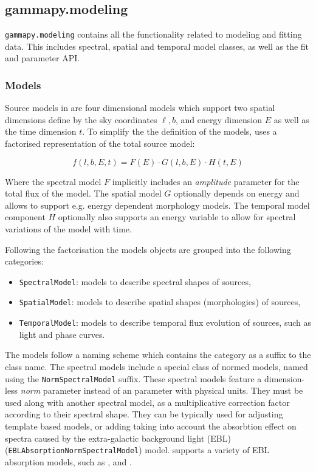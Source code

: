 \documentclass[traditabstract, longauth]{aa}
\newcommand{\code}[1]{\texttt{#1}}
\begin{document}
\subsection{gammapy.modeling}
\label{ssec:gammapy-modeling}
%
\code{gammapy.modeling} contains all the functionality related to modeling and fitting
data. This includes spectral, spatial and temporal model classes, as well as
the fit and parameter API.

\subsubsection{Models}
\label{sssec:models}
Source models in \gammapy are four dimensional models which support two
spatial dimensions define by the sky coordinates $\ell, b$, and energy dimension $E$ as well as
the time dimension $t$. To simplify the the definition of the
models, \gammapy uses a factorised representation of the total source
model:

\begin{equation}
    f(l, b, E, t) = F(E)  \cdot G(l, b, E) \cdot  H(t, E)
\end{equation}

Where the spectral model $F$ implicitly includes an \textit{amplitude} parameter
for the total flux of the model. The spatial model $G$ optionally depends
on energy and allows to support e.g. energy dependent
morphology models. The temporal model component $H$
optionally also supports an energy variable to
allow for spectral variations of the model with time.

Following the factorisation the models objects are grouped
into the following categories:

\begin{itemize}
	\item \code{SpectralModel}: models to describe spectral shapes of sources,
	\item \code{SpatialModel}: models to describe spatial shapes (morphologies) of sources,
	\item \code{TemporalModel}: models to describe temporal flux evolution of sources, such as
	      light and phase curves.
\end{itemize}

The models follow a naming scheme which contains the category as a suffix to
the class name. The spectral models include a special class of normed models,
named using the \code{NormSpectralModel} suffix.
These spectral models feature a dimension-less \textit{norm} parameter
instead of an  parameter with physical units. They
must be used along with another spectral model, as a multiplicative correction
factor according to their spectral shape. They can be typically used for
adjusting template based models, or adding taking into account
the absorbtion effect on 
\gammaray spectra caused by the extra-galactic background light (EBL) (\code{EBLAbsorptionNormSpectralModel})
model. \gammapy supports a variety of EBL absorption models, such as
\cite{Franceschini2008}, \cite{Finke2010} and \cite{Dominguez2011}.
\end{document}
